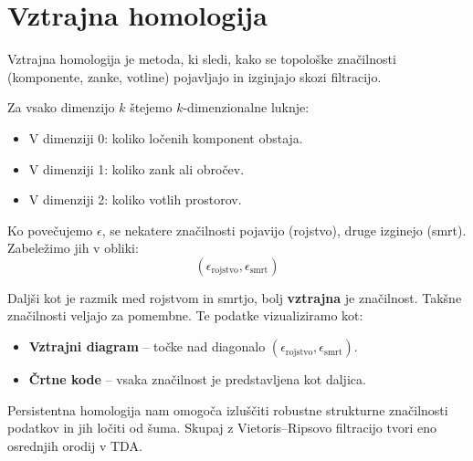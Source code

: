 \section{Vztrajna homologija}
Vztrajna homologija je metoda, ki sledi, kako se topološke značilnosti (komponente, zanke, votline) pojavljajo in izginjajo skozi filtracijo.

Za vsako dimenzijo $k$ štejemo $k$-dimenzionalne luknje:
\begin{itemize}
  \item V dimenziji 0: koliko ločenih komponent obstaja.
  \item V dimenziji 1: koliko zank ali obročev.
  \item V dimenziji 2: koliko votlih prostorov.
\end{itemize}

Ko povečujemo $\epsilon$, se nekatere značilnosti pojavijo (rojstvo), druge izginejo (smrt). Zabeležimo jih v obliki:
\[
(\epsilon_\text{rojstvo}, \epsilon_\text{smrt})
\]

Daljši kot je razmik med rojstvom in smrtjo, bolj \textbf{vztrajna} je značilnost. Takšne značilnosti veljajo za pomembne. Te podatke vizualiziramo kot:
\begin{itemize}
  \item \textbf{Vztrajni diagram} – točke nad diagonalo $(\epsilon_\text{rojstvo}, \epsilon_\text{smrt})$.
  \item \textbf{Črtne kode} – vsaka značilnost je predstavljena kot daljica.
\end{itemize}

Persistentna homologija nam omogoča izluščiti robustne strukturne značilnosti podatkov in jih ločiti od šuma. Skupaj z Vietoris–Ripsovo filtracijo tvori eno osrednjih orodij v TDA.


